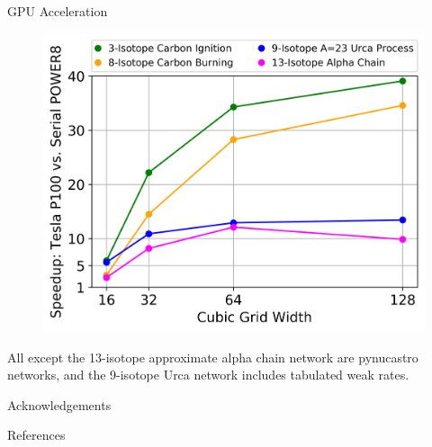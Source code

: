 \documentclass[final]{beamer}
\newlength{\onecolwid}
\begin{document}
\begin{frame}[t]
\begin{columns}[t]
\begin{column}{\onecolwid}
\begin{block}{GPU Acceleration}
\begin{figure}
\includegraphics[width=\linewidth]{figures/starkiller-network/cuda-vode-speedup.png}
\end{figure}

All except the 13-isotope approximate alpha chain network are pynucastro networks, and the 9-isotope Urca network includes tabulated weak rates.

\end{block}




\begin{block}{Acknowledgements}

\small{}

\end{block}


\begin{block}{References}


\end{block}
\end{column}
\end{columns}
\end{frame}
\end{document}

